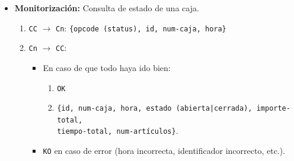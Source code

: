 \begin{itemize}
    \item \textbf{Monitorización:} Consulta de estado de una caja.
    \begin{enumerate}
        \item \texttt{CC} $\rightarrow$ \texttt{Cn}: \texttt{\{opcode (status), id, num-caja, hora\}}
        \item \texttt{Cn} $\rightarrow$ \texttt{CC}: 
        \begin{itemize}
            \item En caso de que todo haya ido bien:
            \begin{enumerate}
                \item \texttt{OK}
                \item \texttt{\{id, num-caja, hora, estado (abierta|cerrada), importe-total,\\
                tiempo-total, num-artículos\}}.
            \end{enumerate}
            \item \texttt{KO} en caso de error (hora incorrecta, identificador incorrecto, etc.).
        \end{itemize}
    \end{enumerate}
\end{itemize}

